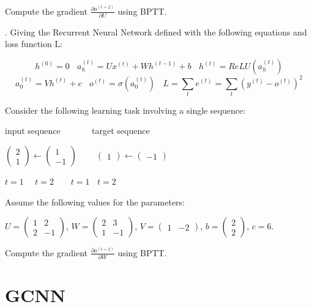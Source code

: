 \noindent Compute the gradient $ \frac{\partial o^{(t=2)}}{\partial U} $ using BPTT.

. Giving the Recurrent Neural Network defined with the following equations and loss function L:

$$ h^{(0)} = 0  ~~~~ a_{h}^{(t)} = Ux^{(t)} + Wh^{(t-1)} + b  ~~~~ h^{(t)} = ReLU(a_{h}^{(t)}) $$
$$ a_{0}^{(t)} = V h^{(t)} + c ~~~~ o^{(t)} = \sigma \left( a_{0}^{(t)} \right) ~~~~ L = \sum_{t} e^{(t)} = \sum_{t} \left( y^{(t)} - o^{(t)} \right)^{2} $$

\noindent Consider the following learning task involving a single sequence:

input sequence   ~~~~~~ target sequence

$ \begin{pmatrix} 2 \\ 1 \end{pmatrix} \leftarrow  \begin{pmatrix} 1 \\ -1 \end{pmatrix}  ~~~~~~~~~~  \begin{pmatrix} 1 \end{pmatrix} \leftarrow  \begin{pmatrix} -1 \end{pmatrix}  $ 

$ t = 1  ~~~~~~ t = 2  ~~~~~~~~~ t=1 ~~~~ t=2$

\noindent Assume the following values for the parameters:

$ U = \begin{pmatrix} 1 & 2 \\ 2 & -1  \end{pmatrix} $, $ W = \begin{pmatrix} 2 & 3 \\ 1 & -1  \end{pmatrix} $, $ V = \begin{pmatrix} 1 & -2 \end{pmatrix} $, $ b = \begin{pmatrix} 2 \\ 2 \end{pmatrix} $, $c=6$. 

\noindent Compute the gradient $ \frac{\partial o^{(t=2)}}{\partial W} $ using BPTT.


\section{ GCNN}

